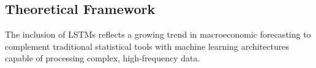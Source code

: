 \subsection{Theoretical Framework}





The inclusion of LSTMs reflects a growing trend in macroeconomic forecasting to complement traditional statistical tools with machine learning architectures capable of processing complex, high-frequency data.




